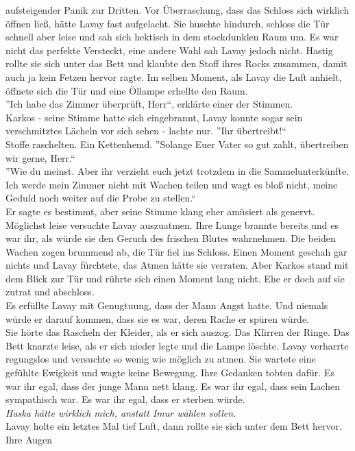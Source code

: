 aufsteigender Panik zur Dritten. Vor Überraschung, dass das Schloss sich wirklich öffnen ließ, hätte 
Lavay fast aufgelacht. Sie huschte hindurch, schloss die Tür schnell aber leise und sah sich 
hektisch in dem stockdunklen Raum um. Es war nicht das perfekte Versteckt, eine andere Wahl sah 
Lavay jedoch nicht. Hastig rollte sie sich unter das Bett und klaubte den Stoff ihres Rocks 
zusammen, damit auch ja kein Fetzen hervor ragte. Im selben Moment, als Lavay die Luft anhielt, 
öffnete sich die Tür und eine Öllampe erhellte den Raum.\\
''Ich habe das Zimmer überprüft, Herr``, erklärte einer der Stimmen.\\
Karkos - seine Stimme hatte sich eingebrannt, Lavay konnte sogar sein verschmitztes Lächeln vor 
sich sehen - lachte nur. ''Ihr übertreibt!``\\
Stoffe raschelten. Ein Kettenhemd. ''Solange Euer Vater so gut zahlt, übertreiben wir gerne, 
Herr.``\\
''Wie du meinst. Aber ihr verzieht euch jetzt trotzdem in die Sammelunterkünfte. Ich werde mein 
Zimmer nicht mit Wachen teilen und wagt es bloß nicht, meine Geduld noch weiter auf die Probe zu 
stellen.``\\
Er sagte es bestimmt, aber seine Stimme klang eher amüsiert als genervt. Möglichst leise versuchte 
Lavay auszuatmen. Ihre Lunge brannte bereits und es war ihr, als würde sie den Geruch des frischen 
Blutes wahrnehmen. Die beiden Wachen zogen brummend ab, die Tür fiel ins Schloss. Einen Moment 
geschah gar nichts und Lavay fürchtete, das Atmen hätte sie verraten. Aber Karkos stand mit dem 
Blick zur Tür und rührte sich einen Moment lang nicht. Ehe er doch auf sie zutrat und abschloss.\\
Es erfüllte Lavay mit Genugtuung, dass der Mann Angst hatte. Und niemals würde er darauf kommen, 
dass sie es war, deren Rache er spüren würde.\\
Sie hörte das Rascheln der Kleider, als er sich auszog. Das Klirren der Ringe. Das Bett knarzte 
leise, als er sich nieder legte und die Lampe löschte. Lavay verharrte regungslos und versuchte so 
wenig wie möglich zu atmen. Sie wartete eine gefühlte Ewigkeit und wagte keine Bewegung. Ihre 
Gedanken tobten dafür. Es war ihr egal, dass der junge Mann nett klang. Es war ihr egal, dass sein 
Lachen sympathisch war. Es war ihr egal, dass er sterben würde.\\
\textit{Haska hätte wirklich mich, anstatt Imur wählen sollen.}\\
Lavay holte ein letztes Mal tief Luft, dann rollte sie sich unter dem Bett hervor. Ihre Augen 
